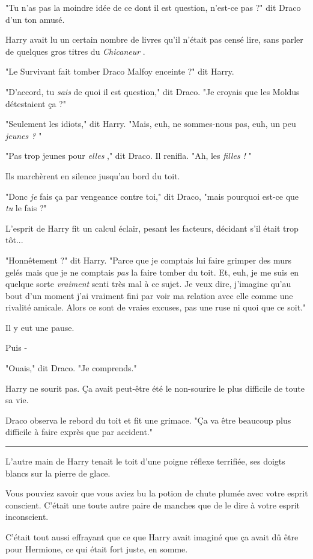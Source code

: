 "Tu n'as pas la moindre idée de ce dont il est question, n'est-ce pas ?" dit Draco d'un ton amusé.

Harry avait lu un certain nombre de livres qu'il n'était pas censé lire, sans parler de quelques gros titres du \emph{Chicaneur} .

"Le Survivant fait tomber Draco Malfoy enceinte ?" dit Harry.

"D'accord, tu \emph{sais}  de quoi il est question," dit Draco. "Je croyais que les Moldus détestaient ça ?"

"Seulement les idiots," dit Harry. "Mais, euh, ne sommes-nous pas, euh, un peu \emph{jeunes ?} "

"Pas trop jeunes pour \emph{elles} ," dit Draco. Il renifla. "Ah, les\emph{ filles !} "

Ils marchèrent en silence jusqu'au bord du toit.

"Donc \emph{je}  fais ça par vengeance contre toi," dit Draco, "mais pourquoi est-ce que \emph{tu}  le fais ?"

L'esprit de Harry fit un calcul éclair, pesant les facteurs, décidant s'il était trop tôt...

"Honnêtement ?" dit Harry. "Parce que je comptais lui faire grimper des murs gelés mais que je ne comptais \emph{pas}  la faire tomber du toit. Et, euh, je me suis en quelque sorte \emph{vraiment}  senti très mal à ce sujet. Je veux dire, j'imagine qu'au bout d'un moment j'ai vraiment fini par voir ma relation avec elle comme une rivalité amicale. Alors ce sont de vraies excuses, pas une ruse ni quoi que ce soit."

Il y eut une pause.

Puis -

"Ouais," dit Draco. "Je comprends."

Harry ne sourit pas. Ça avait peut-être été le non-sourire le plus difficile de toute sa vie.

Draco observa le rebord du toit et fit une grimace. "Ça va être beaucoup plus difficile à faire exprès que par accident."
\par\noindent\rule{\textwidth}{0.4pt}
L'autre main de Harry tenait le toit d'une poigne réflexe terrifiée, ses doigts blancs sur la pierre de glace.

Vous pouviez savoir que vous aviez bu la potion de chute plumée avec votre esprit conscient. C'était une toute autre paire de manches que de le dire à votre esprit inconscient.

C'était tout aussi effrayant que ce que Harry avait imaginé que ça avait dû être pour Hermione, ce qui était fort juste, en somme.

